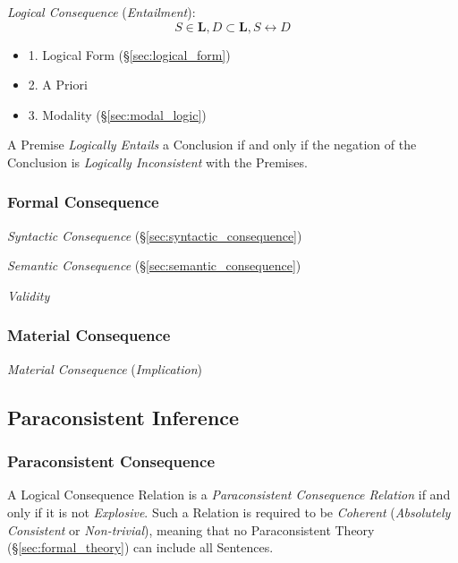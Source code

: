 \emph{Logical Consequence} (\emph{Entailment}):
\[
    S \in \mathbf{L}, D \subset \mathbf{L}, S \leftrightarrow D
\]
\begin{itemize}
    \item 1. Logical Form (\S\ref{sec:logical_form})
    \item 2. A Priori
    \item 3. Modality (\S\ref{sec:modal_logic})
\end{itemize}

A Premise \emph{Logically Entails} a Conclusion if and only if the
negation of the Conclusion is \emph{Logically Inconsistent} with the
Premises.



\subsubsection{Formal Consequence}\label{sec:formal_consequence}

\emph{Syntactic Consequence} (\S\ref{sec:syntactic_consequence})

\emph{Semantic Consequence} (\S\ref{sec:semantic_consequence})

\emph{Validity}



\subsubsection{Material Consequence}

\emph{Material Consequence} (\emph{Implication})



\subsection{Paraconsistent Inference}\label{sec:paraconsistent_inference}
\cite{priest-tanaka-weber13}

\subsubsection{Paraconsistent Consequence}\label{sec:paraconsistent_consequence}

A Logical Consequence Relation is a \emph{Paraconsistent Consequence
  Relation} if and only if it is not \emph{Explosive}. Such a Relation
is required to be \emph{Coherent} (\emph{Absolutely Consistent} or
\emph{Non-trivial}), meaning that no Paraconsistent Theory
(\S\ref{sec:formal_theory}) can include all Sentences.

